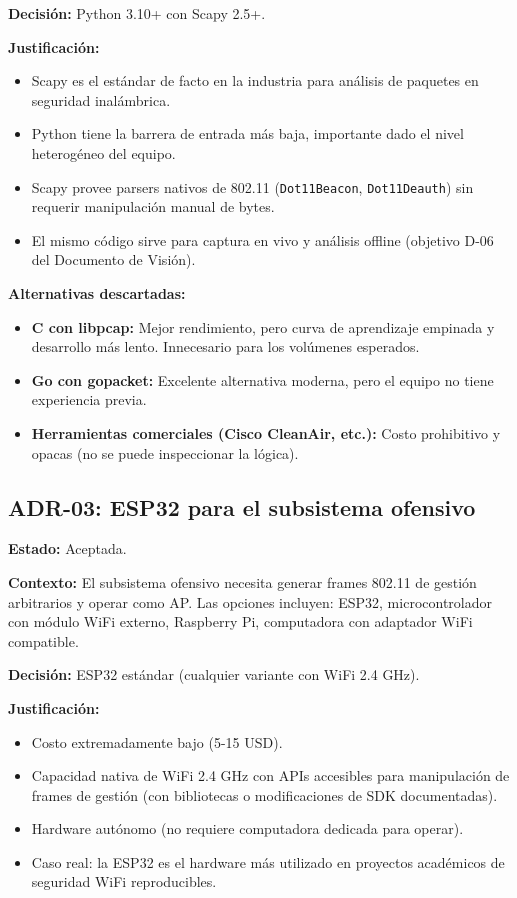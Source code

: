 \documentclass[11pt,a4paper]{article}
\begin{document}
\textbf{Decisión:} Python 3.10+ con Scapy 2.5+.

\textbf{Justificación:}

\begin{itemize}
  \item Scapy es el estándar de facto en la industria para análisis de
    paquetes en seguridad inalámbrica.
  \item Python tiene la barrera de entrada más baja, importante dado el
    nivel heterogéneo del equipo.
  \item Scapy provee parsers nativos de 802.11 (\texttt{Dot11Beacon},
    \texttt{Dot11Deauth}) sin requerir manipulación manual de bytes.
  \item El mismo código sirve para captura en vivo y análisis offline
    (objetivo D-06 del Documento de Visión).
\end{itemize}

\textbf{Alternativas descartadas:}

\begin{itemize}
  \item \textbf{C con libpcap:} Mejor rendimiento, pero curva de
    aprendizaje empinada y desarrollo más lento. Innecesario para los
    volúmenes esperados.
  \item \textbf{Go con gopacket:} Excelente alternativa moderna, pero
    el equipo no tiene experiencia previa.
  \item \textbf{Herramientas comerciales (Cisco CleanAir, etc.):} Costo
    prohibitivo y opacas (no se puede inspeccionar la lógica).
\end{itemize}

\subsection{ADR-03: ESP32 para el subsistema ofensivo}

\textbf{Estado:} Aceptada.

\textbf{Contexto:} El subsistema ofensivo necesita generar frames 802.11
de gestión arbitrarios y operar como AP. Las opciones incluyen: ESP32,
microcontrolador con módulo WiFi externo, Raspberry Pi, computadora con
adaptador WiFi compatible.

\textbf{Decisión:} ESP32 estándar (cualquier variante con WiFi 2.4 GHz).

\textbf{Justificación:}

\begin{itemize}
  \item Costo extremadamente bajo (5-15 USD).
  \item Capacidad nativa de WiFi 2.4 GHz con APIs accesibles para
    manipulación de frames de gestión (con bibliotecas o modificaciones
    de SDK documentadas).
  \item Hardware autónomo (no requiere computadora dedicada para operar).
  \item Caso real: la ESP32 es el hardware más utilizado en proyectos
    académicos de seguridad WiFi reproducibles.
\end{itemize}
\end{document}
